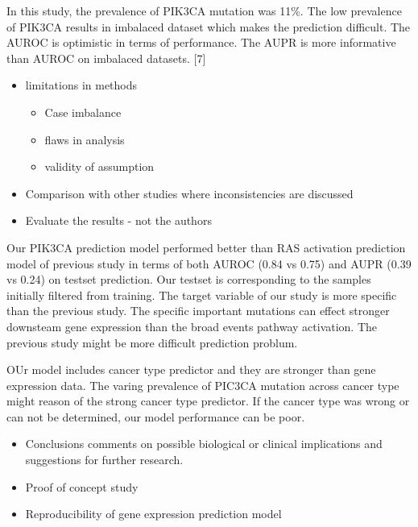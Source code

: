 \documentclass[10pt,letterpaper]{article}
\providecommand{\tightlist}{%
  \setlength{\itemsep}{0pt}\setlength{\parskip}{0pt}}
\begin{document}
In this study, the prevalence of PIK3CA mutation was 11\%. The low
prevalence of PIK3CA results in imbalaced dataset which makes the
prediction difficult. The AUROC is optimistic in terms of performance.
The AUPR is more informative than AUROC on imbalaced datasets. {[}7{]}

\begin{itemize}
\item
  limitations in methods

  \begin{itemize}
  \tightlist
  \item
    Case imbalance\\
  \item
    flaws in analysis\\
  \item
    validity of assumption
  \end{itemize}
\item
  Comparison with other studies where inconsistencies are discussed\\
\item
  Evaluate the results - not the authors
\end{itemize}

Our PIK3CA prediction model performed better than RAS activation
prediction model of previous study in terms of both AUROC (0.84 vs 0.75)
and AUPR (0.39 vs 0.24) on testset prediction. Our testset is
corresponding to the samples initially filtered from training. The
target variable of our study is more specific than the previous study.
The specific important mutations can effect stronger downsteam gene
expression than the broad events pathway activation. The previous study
might be more difficult prediction problum.

OUr model includes cancer type predictor and they are stronger than gene
expression data. The varing prevalence of PIC3CA mutation across cancer
type might reason of the strong cancer type predictor. If the cancer
type was wrong or can not be determined, our model performance can be
poor.

\begin{itemize}
\item
  Conclusions comments on possible biological or clinical implications
  and suggestions for further research.
\item
  Proof of concept study\\
\item
  Reproducibility of gene expression prediction model
\end{itemize}
\end{document}
